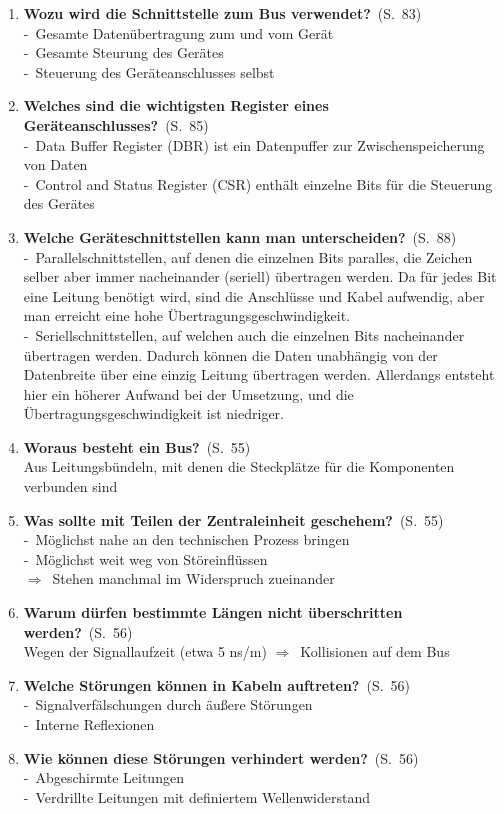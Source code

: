 \documentclass[a4paper,12pt]{article}
\newcommand{\question}[3]{\pagebreak[3]\item {\textbf{#1?}}\ (S.\ #2)#3}
\newcommand{\catchword}[1]{\\-\ #1}
\newcommand{\normaltext}[1]{\\#1}
\newcommand{\result}[1]{\\ $\Rightarrow$\ #1}
\newcommand{\resultol}[1]{ $\Rightarrow$\ #1}
\newcommand{\page}[1]{#1}
\begin{document}
\begin{enumerate}
  \question{Wozu wird die Schnittstelle zum Bus verwendet}{\page{83}}
  {
    \catchword{Gesamte Datenübertragung zum und vom Gerät}
    \catchword{Gesamte Steurung des Gerätes}
    \catchword{Steuerung des Geräteanschlusses selbst}
  }

  \question{Welches sind die wichtigsten Register eines Geräteanschlusses}{\page{85}}
  {
    \catchword{Data Buffer Register (DBR) ist ein Datenpuffer zur Zwischenspeicherung von Daten}
    \catchword{Control and Status Register (CSR) enthält einzelne Bits für die Steuerung des Gerätes}
  }

  \question{Welche Geräteschnittstellen kann man unterscheiden}{\page{88}}
  {
    \catchword{Parallelschnittstellen, auf denen die einzelnen Bits paralles, die Zeichen selber 
               aber immer nacheinander (seriell) übertragen werden. Da für jedes Bit eine Leitung benötigt 
               wird, sind die Anschlüsse und Kabel aufwendig, aber man erreicht eine hohe
               Übertragungsgeschwindigkeit.}
    \catchword{Seriellschnittstellen, auf welchen auch die einzelnen Bits nacheinander übertragen werden. 
               Dadurch können die Daten unabhängig von der Datenbreite über eine einzig Leitung
               übertragen werden. Allerdangs entsteht hier ein höherer Aufwand bei der Umsetzung, und 
               die Übertragungsgeschwindigkeit ist niedriger.}
  }

  \question{Woraus besteht ein Bus}{\page{55}}
  {
    \normaltext{Aus Leitungsbündeln, mit denen die Steckplätze für die Komponenten verbunden sind}
  }

  \question{Was sollte mit Teilen der Zentraleinheit geschehem}{\page{55}}
  {
    \catchword{Möglichst nahe an den technischen Prozess bringen}
    \catchword{Möglichst weit weg von Störeinflüssen}
    \result{Stehen manchmal im Widerspruch zueinander}
  }

  \question{Warum dürfen bestimmte Längen nicht überschritten werden}{\page{56}}
  {
    \normaltext{Wegen der Signallaufzeit (etwa 5 ns/m)\resultol{Kollisionen auf dem Bus}}
  }

  \question{Welche Störungen können in Kabeln auftreten}{\page{56}}
  {
    \catchword{Signalverfälschungen durch äußere Störungen}
    \catchword{Interne Reflexionen}
  }

  \question{Wie können diese Störungen verhindert werden}{\page{56}}
  {
    \catchword{Abgeschirmte Leitungen}
    \catchword{Verdrillte Leitungen mit definiertem Wellenwiderstand}
  }


\end{enumerate}
\end{document}
